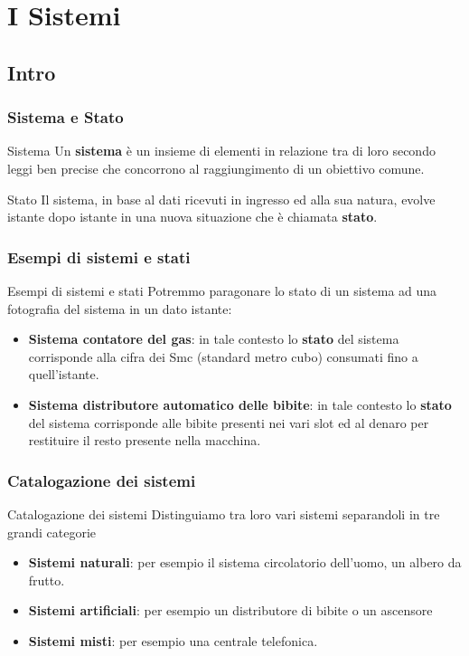 \section[I Sistemi]{I Sistemi}

\subsection[Intro]{Intro}

\begin{frame}
	\frametitle{Sistema e Stato}
	
	\begin{block}{Sistema}
		Un \textbf{sistema} è un insieme di elementi in relazione tra di loro secondo leggi ben precise che concorrono al raggiungimento di un obiettivo comune.
	\end{block}
	\begin{block}{Stato}
		Il sistema, in base al dati ricevuti in ingresso ed alla sua natura, evolve istante dopo istante in una nuova situazione che è chiamata \textbf{stato}.
	\end{block}
\end{frame}


\begin{frame}
	\frametitle{Esempi di sistemi e stati}
	
	\begin{block}{Esempi di sistemi e stati}
		Potremmo paragonare lo stato di un sistema ad una fotografia del sistema in un dato istante:
		\begin{itemize}
			\item \textbf{Sistema contatore del gas}: in tale contesto lo \textbf{stato} del sistema corrisponde alla cifra dei Smc (standard metro cubo) consumati fino a quell'istante.
			\item \textbf{Sistema distributore automatico delle bibite}: in tale contesto lo \textbf{stato} del sistema corrisponde alle bibite presenti nei vari slot ed al denaro per restituire il resto presente nella macchina.
		\end{itemize}
	\end{block}
\end{frame}


\begin{frame}
	\frametitle{Catalogazione dei sistemi}
	
	\begin{block}{Catalogazione dei sistemi}
		Distinguiamo tra loro vari sistemi separandoli in tre grandi categorie
		\begin{itemize}
			\item \textbf{Sistemi naturali}: per esempio il sistema circolatorio dell’uomo, un albero da frutto.
			\item \textbf{Sistemi artificiali}: per esempio un distributore di bibite o un ascensore
			\item \textbf{Sistemi misti}: per esempio una centrale telefonica.
		\end{itemize}
	\end{block}
\end{frame}


